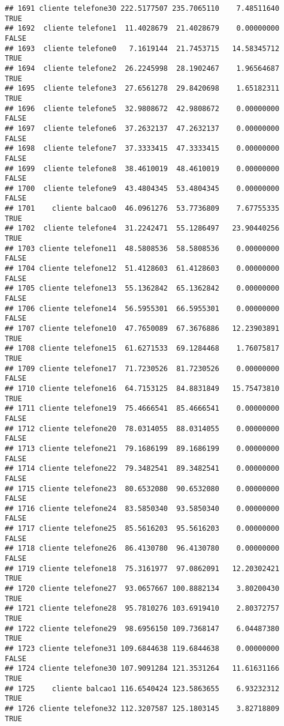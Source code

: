 \documentclass[
]{article}
\begin{document}
\begin{verbatim}
## 1691 cliente telefone30 222.5177507 235.7065110    7.48511640     TRUE
## 1692  cliente telefone1  11.4028679  21.4028679    0.00000000    FALSE
## 1693  cliente telefone0   7.1619144  21.7453715   14.58345712     TRUE
## 1694  cliente telefone2  26.2245998  28.1902467    1.96564687     TRUE
## 1695  cliente telefone3  27.6561278  29.8420698    1.65182311     TRUE
## 1696  cliente telefone5  32.9808672  42.9808672    0.00000000    FALSE
## 1697  cliente telefone6  37.2632137  47.2632137    0.00000000    FALSE
## 1698  cliente telefone7  37.3333415  47.3333415    0.00000000    FALSE
## 1699  cliente telefone8  38.4610019  48.4610019    0.00000000    FALSE
## 1700  cliente telefone9  43.4804345  53.4804345    0.00000000    FALSE
## 1701    cliente balcao0  46.0961276  53.7736809    7.67755335     TRUE
## 1702  cliente telefone4  31.2242471  55.1286497   23.90440256     TRUE
## 1703 cliente telefone11  48.5808536  58.5808536    0.00000000    FALSE
## 1704 cliente telefone12  51.4128603  61.4128603    0.00000000    FALSE
## 1705 cliente telefone13  55.1362842  65.1362842    0.00000000    FALSE
## 1706 cliente telefone14  56.5955301  66.5955301    0.00000000    FALSE
## 1707 cliente telefone10  47.7650089  67.3676886   12.23903891     TRUE
## 1708 cliente telefone15  61.6271533  69.1284468    1.76075817     TRUE
## 1709 cliente telefone17  71.7230526  81.7230526    0.00000000    FALSE
## 1710 cliente telefone16  64.7153125  84.8831849   15.75473810     TRUE
## 1711 cliente telefone19  75.4666541  85.4666541    0.00000000    FALSE
## 1712 cliente telefone20  78.0314055  88.0314055    0.00000000    FALSE
## 1713 cliente telefone21  79.1686199  89.1686199    0.00000000    FALSE
## 1714 cliente telefone22  79.3482541  89.3482541    0.00000000    FALSE
## 1715 cliente telefone23  80.6532080  90.6532080    0.00000000    FALSE
## 1716 cliente telefone24  83.5850340  93.5850340    0.00000000    FALSE
## 1717 cliente telefone25  85.5616203  95.5616203    0.00000000    FALSE
## 1718 cliente telefone26  86.4130780  96.4130780    0.00000000    FALSE
## 1719 cliente telefone18  75.3161977  97.0862091   12.20302421     TRUE
## 1720 cliente telefone27  93.0657667 100.8882134    3.80200430     TRUE
## 1721 cliente telefone28  95.7810276 103.6919410    2.80372757     TRUE
## 1722 cliente telefone29  98.6956150 109.7368147    6.04487380     TRUE
## 1723 cliente telefone31 109.6844638 119.6844638    0.00000000    FALSE
## 1724 cliente telefone30 107.9091284 121.3531264   11.61631166     TRUE
## 1725    cliente balcao1 116.6540424 123.5863655    6.93232312     TRUE
## 1726 cliente telefone32 112.3207587 125.1803145    3.82718809     TRUE

\end{verbatim}
\end{document}
